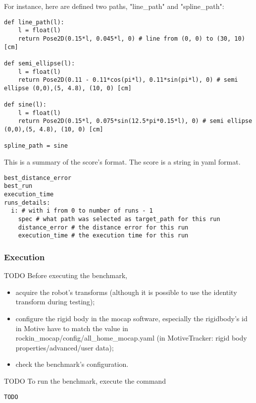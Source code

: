 \documentclass[a4paper]{article}
\begin{document}
For instance, here are defined two paths, "line\_path" and "spline\_path":
\begin{verbatim}
def line_path(l):
	l = float(l)
	return Pose2D(0.15*l, 0.045*l, 0) # line from (0, 0) to (30, 10) [cm]

def semi_ellipse(l):
	l = float(l)
	return Pose2D(0.11 - 0.11*cos(pi*l), 0.11*sin(pi*l), 0) # semi ellipse (0,0),(5, 4.8), (10, 0) [cm]

def sine(l):
	l = float(l)
	return Pose2D(0.15*l, 0.075*sin(12.5*pi*0.15*l), 0) # semi ellipse (0,0),(5, 4.8), (10, 0) [cm]

spline_path = sine
\end{verbatim} 

\label{sec:fbm3w_score_data_format}

This is a summary of the score's format.
The score is a string in yaml format.

\begin{verbatim}
best_distance_error
best_run
execution_time
runs_details:
  i: # with i from 0 to number of runs - 1
    spec # what path was selected as target_path for this run
    distance_error # the distance error for this run
    execution_time # the execution time for this run
\end{verbatim} 


\subsubsection{Execution}
\label{sec:fbm3w_execution}
TODO
Before executing the benchmark,
\begin{itemize}
  \item acquire the robot's transforms (although it is possible to use the identity transform during testing);
  \item configure the rigid body in the mocap software, especially the rigidbody's id in Motive have to match the value in rockin\_mocap/config/all\_home\_mocap.yaml (in MotiveTracker: rigid body properties/advanced/user data);
  \item check the benchmark's configuration.
\end{itemize}


TODO
To run the benchmark, execute the command
\begin{verbatim}
TODO
\end{verbatim} 
\end{document}
